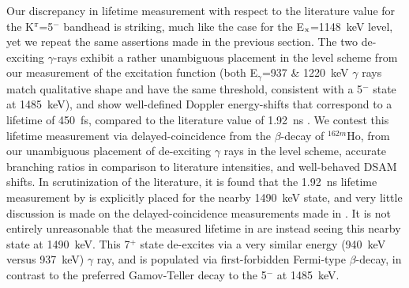 Our discrepancy in lifetime measurement with respect to the literature value for the K$^\pi$=5$^-$ bandhead is striking, much like the case for the E$_{\rm x}$=1148~keV level, yet we repeat the same assertions made in the previous section. The two de-exciting $\gamma$-rays exhibit a rather unambiguous placement in the level scheme from our measurement of the excitation function (both E$_\gamma$=937 \& 1220~keV $\gamma$ rays match qualitative shape and have the same threshold, consistent with a 5$^-$ state at 1485~keV), and show well-defined Doppler energy-shifts that correspond to a lifetime of 450~fs, compared to the literature value of 1.92~ns \cite{Honig_5minus1969}. We contest this lifetime measurement via delayed-coincidence from the $\beta$-decay of $^{162m}$Ho, from our unambiguous placement of de-exciting $\gamma$ rays in the level scheme, accurate branching ratios in comparison to literature intensities, and well-behaved DSAM shifts. In scrutinization of the literature, it is found that the 1.92~ns lifetime measurement by \cite{Honig_5minus1969} is explicitly placed for the nearby 1490~keV state, and very little discussion is made on the delayed-coincidence measurements made in \cite{CHARVET_162Dy5minus}. It is not entirely unreasonable that the measured lifetime in \cite{Honig_5minus1969,CHARVET_162Dy5minus} are instead seeing this nearby state at 1490~keV. This 7$^+$ state de-excites via a very similar energy (940~keV versus 937~keV) $\gamma$ ray, and is populated via first-forbidden Fermi-type $\beta$-decay, in contrast to the preferred Gamov-Teller decay to the 5$^-$ at 1485~keV. 

